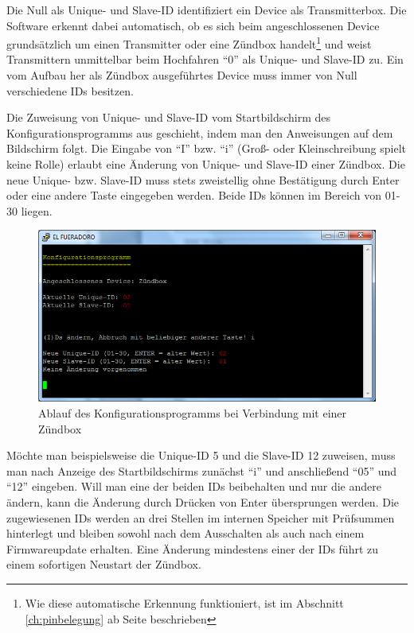 \documentclass[pdftex, parskip, numbers=noenddot, toc=listof]{scrbook}
\begin{document}
	Die Null als Unique- und Slave-ID identifiziert ein Device als Transmitterbox. Die Software erkennt dabei automatisch, ob es sich beim angeschlossenen Device grundsätzlich um einen Transmitter oder eine Zündbox handelt\footnote{Wie diese automatische Erkennung funktioniert, ist im Abschnitt \ref{ch:pinbelegung} ab Seite \pageref{ch:pinbelegung} beschrieben} und weist Transmittern unmittelbar beim Hochfahren \enquote{0} als Unique- und Slave-ID zu. Ein vom Aufbau her als Zündbox ausgeführtes Device muss immer von Null verschiedene IDs besitzen.

	Die Zuweisung von Unique- und Slave-ID vom Startbildschirm des Konfigurationsprogramms aus geschieht, indem man den Anweisungen auf dem Bildschirm folgt. Die Eingabe von \enquote{I} bzw. \enquote{i} (Groß- oder Kleinschreibung spielt keine Rolle) erlaubt eine Änderung von Unique- und Slave-ID einer Zündbox. Die neue Unique- bzw. Slave-ID muss stets zweistellig ohne Bestätigung durch Enter oder eine andere Taste eingegeben werden. Beide IDs können im Bereich von 01-30 liegen.

	\begin{figure}
		\centering
		\includegraphics[width=.8\textwidth]{Bilder/conf}
		\caption{Ablauf des Konfigurationsprogramms bei Verbindung mit einer Zündbox}
		\label{fig:conf}
	\end{figure}

	Möchte man beispielsweise die Unique-ID 5 und die Slave-ID 12 zuweisen, muss man nach Anzeige des Startbildschirms zunächst \enquote{i} und anschließend \enquote{05} und \enquote{12} eingeben. Will man eine der beiden IDs beibehalten und nur die andere ändern, kann die Änderung durch Drücken von Enter übersprungen werden. Die zugewiesenen IDs werden an drei Stellen im internen Speicher mit Prüfsummen hinterlegt und bleiben sowohl nach dem Ausschalten als auch nach einem Firmwareupdate erhalten. Eine Änderung mindestens einer der IDs führt zu einem sofortigen Neustart der Zündbox.
\end{document}
